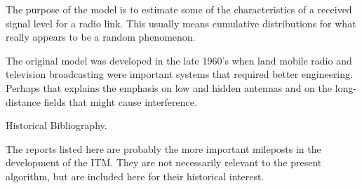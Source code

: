    The purpose of the model is to estimate some of the characteristics of a
   received signal level for a radio link.  This usually means cumulative
   distributions for what really appears to be a random phenomenon.

     The original model was developed in the late 1960's when land mobile
   radio and television broadcasting were important systems that required
   better engineering.  Perhaps that explains the emphasis on low and
   hidden antennas and on the long-distance fields that might cause
   interference.

   \newsec Historical Bibliography.

   The reports listed here are probably the more important mileposts in the
   development of the ITM.  They are not necessarily relevant to the
   present algorithm, but are included here for their historical interest.

